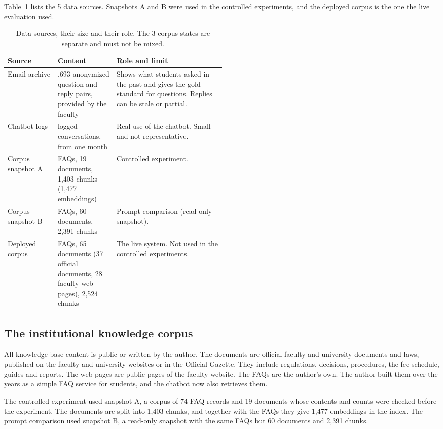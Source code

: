 Table~\ref{tab:sources} lists the 5 data sources. Snapshots A and B were used in the controlled experiments, and the deployed corpus is the one the live evaluation used.

\begin{table}[htbp]
\centering
\caption[Data sources, their size and their role]{Data sources, their size and their role. The 3 corpus states are separate and must not be mixed.}
\label{tab:sources}
\small
\begin{tabularx}{\linewidth}{@{}>{\raggedright\arraybackslash}p{0.23\linewidth}>{\raggedright\arraybackslash}p{0.27\linewidth}X@{}}
\toprule
Source & Content & Role and limit \\
\midrule
Email archive & 1,693 anonymized question and reply pairs, provided by the faculty & Shows what students asked in the past and gives the gold standard for questions. Replies can be stale or partial. \\
Chatbot logs & 172 logged conversations, from one month & Real use of the chatbot. Small and not representative. \\
Corpus snapshot A & 74 FAQs, 19 documents, 1,403 chunks (1,477 embeddings) & Controlled experiment. \\
Corpus snapshot B & 74 FAQs, 60 documents, 2,391 chunks & Prompt comparison (read-only snapshot). \\
Deployed corpus & 104 FAQs, 65 documents (37 official documents, 28 faculty web pages), 2,524 chunks & The live system. Not used in the controlled experiments. \\
\bottomrule
\end{tabularx}
\end{table}

\subsection{The institutional knowledge corpus}

All knowledge-base content is public or written by the author. The documents are official faculty and university documents and laws, published on the faculty and university websites or in the Official Gazette. They include regulations, decisions, procedures, the fee schedule, guides and reports. The web pages are public pages of the faculty website. The FAQs are the author's own. The author built them over the years as a simple FAQ service for students, and the chatbot now also retrieves them.

The controlled experiment used snapshot A, a corpus of 74 FAQ records and 19 documents whose contents and counts were checked before the experiment. The documents are split into 1,403 chunks, and together with the FAQs they give 1,477 embeddings in the index. The prompt comparison used snapshot B, a read-only snapshot with the same FAQs but 60 documents and 2,391 chunks.

